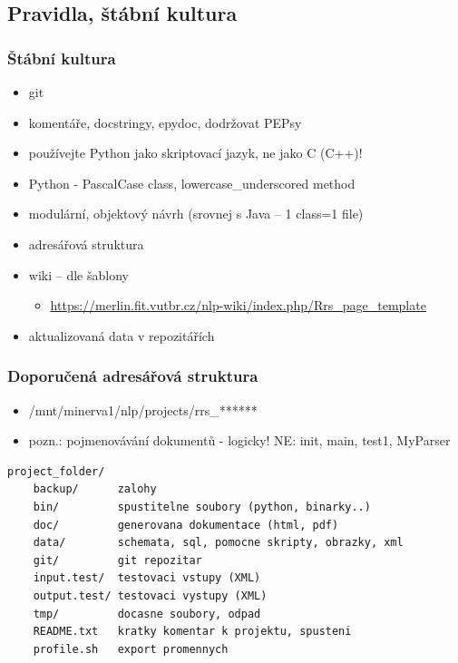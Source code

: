 \documentclass{beamer}
\begin{document}
\subsection{Pravidla, štábní kultura}
\begin{frame}
  \frametitle{Štábní kultura}
  \begin{itemize}
    \item git
    \item komentáře, docstringy, epydoc, dodržovat PEPsy
    \item používejte Python jako skriptovací jazyk, ne jako C (C++)!
    \item Python - PascalCase class, lowercase\_underscored method
    \item modulární, objektový návrh (srovnej s Java – 1 class=1 file)
    \item adresářová struktura
    \item wiki – dle šablony
    \begin{itemize}
      \item \tiny{\textcolor{blue}{\underline{\href{https://merlin.fit.vutbr.cz/nlp-wiki/index.php/Rrs\_page\_template}{https://merlin.fit.vutbr.cz/nlp-wiki/index.php/Rrs\_page\_template}}}}
    \end{itemize}
    \item aktualizovaná data v repozitářích
  \end{itemize}
\end{frame}

\begin{frame}[containsverbatim]
  \frametitle{Doporučená adresářová struktura}
  \begin{itemize}
    \item /mnt/minerva1/nlp/projects/rrs\_******
    \item pozn.: pojmenovávání dokumentů - logicky! NE: init, main, test1, MyParser
  \end{itemize}
  \begingroup
  \fontsize{9pt}{11pt}\selectfont
  \begin{verbatim}
project_folder/
    backup/      zalohy
    bin/         spustitelne soubory (python, binarky..)
    doc/         generovana dokumentace (html, pdf)
    data/        schemata, sql, pomocne skripty, obrazky, xml
    git/         git repozitar
    input.test/  testovaci vstupy (XML)
    output.test/ testovaci vystupy (XML)
    tmp/         docasne soubory, odpad
    README.txt   kratky komentar k projektu, spusteni
    profile.sh   export promennych
  \end{verbatim}
  \endgroup
\end{frame}
\end{document}
